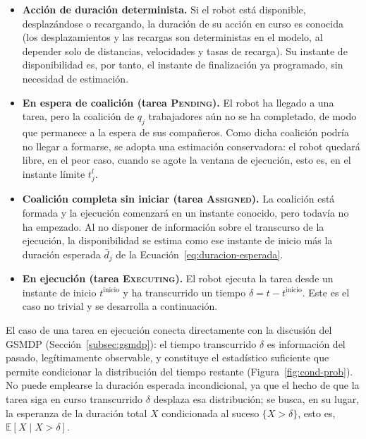 \begin{itemize}
    \item \textbf{Acción de duración determinista.} Si el robot está disponible, desplazándose o recargando, la duración de su acción en curso es conocida (los desplazamientos y las recargas son deterministas en el modelo, al depender solo de distancias, velocidades y tasas de recarga). Su instante de disponibilidad es, por tanto, el instante de finalización ya programado, sin necesidad de estimación.
    \item \textbf{En espera de coalición (tarea \textsc{Pending}).} El robot ha llegado a una tarea, pero la coalición de $q_j$ trabajadores aún no se ha completado, de modo que permanece a la espera de sus compañeros. Como dicha coalición podría no llegar a formarse, se adopta una estimación conservadora: el robot quedará libre, en el peor caso, cuando se agote la ventana de ejecución, esto es, en el instante límite $t_j^{l}$.
    \item \textbf{Coalición completa sin iniciar (tarea \textsc{Assigned}).} La coalición está formada y la ejecución comenzará en un instante conocido, pero todavía no ha empezado. Al no disponer de información sobre el transcurso de la ejecución, la disponibilidad se estima como ese instante de inicio más la duración esperada $\bar{d}_j$ de la Ecuación~\eqref{eq:duracion-esperada}.
    \item \textbf{En ejecución (tarea \textsc{Executing}).} El robot ejecuta la tarea desde un instante de inicio $t^{\mathrm{inicio}}$ y ha transcurrido un tiempo $\delta = t - t^{\mathrm{inicio}}$. Este es el caso no trivial y se desarrolla a continuación.
\end{itemize}
 
El caso de una tarea en ejecución conecta directamente con la discusión del GSMDP (Sección~\ref{subsec:gsmdp}): el tiempo transcurrido $\delta$ es información del pasado, legítimamente observable, y constituye el estadístico suficiente que permite condicionar la distribución del tiempo restante (Figura~\ref{fig:cond-prob}). No puede emplearse la duración esperada incondicional, ya que el hecho de que la tarea siga en curso transcurrido $\delta$ desplaza esa distribución; se busca, en su lugar, la esperanza de la duración total $X$ condicionada al suceso $\{X>\delta\}$, esto es, $\mathbb{E}[X\mid X>\delta]$.
 
